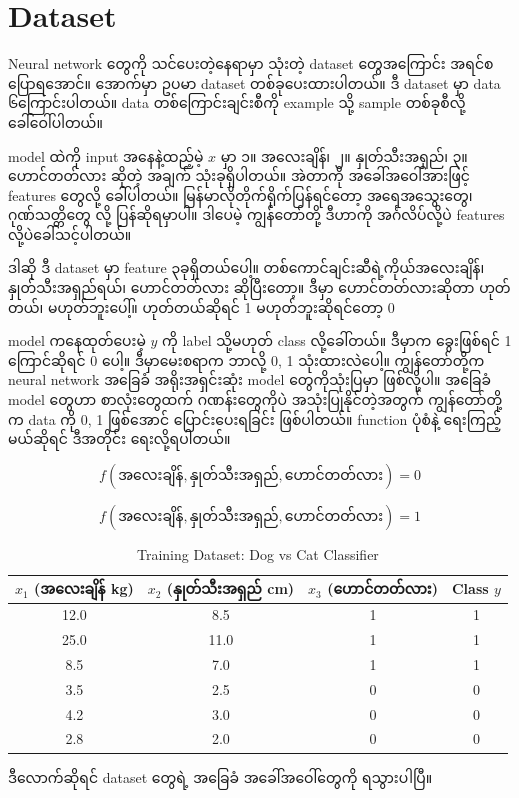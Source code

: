 \section{Dataset}
Neural network တွေကို သင်ပေးတဲ့နေရာမှာ သုံးတဲ့ dataset တွေအကြောင်း အရင်စပြောရအောင်။
အောက်မှာ ဥပမာ dataset တစ်ခုပေးထားပါတယ်။ ဒီ dataset မှာ data ၆ကြောင်းပါတယ်။
data တစ်ကြောင်းချင်းစီကို example သို့ sample တစ်ခုစီလို့ ခေါ်ဝေါ်ပါတယ်။

model ထဲကို input အနေနဲ့ထည့်မဲ့ $x$ မှာ ၁။ အလေးချိန်၊ ၂။ နှုတ်သီးအရှည်၊ ၃။ ဟောင်တတ်လား ဆိုတဲ့
အချက် သုံးခုရှိပါတယ်။ အဲတာကို အခေါ်အဝေါ်အားဖြင့် features တွေလို့ ခေါ်ပါတယ်။ မြန်မာလိုတိုက်ရိုက်ပြန်ရင်တော့ အရေအသွေးတွေ၊
ဂုဏ်သတ္တိတွေ လို့ ပြန်ဆိုရမှာပါ။ ဒါပေမဲ့ ကျွန်တော်တို့ ဒီဟာကို အင်္ဂလိပ်လို့ပဲ features လို့ပဲခေါ်သင့်ပါတယ်။

ဒါဆို ဒီ dataset မှာ feature ၃ခုရှိတယ်ပေါ့။ တစ်ကောင်ချင်းဆီရဲ့ကိုယ်အလေးချိန်၊ နှုတ်သီးအရှည်ရယ်၊ ဟောင်တတ်လား ဆိုပြီးတော့။
ဒီမှာ ဟောင်တတ်လားဆိုတာ ဟုတ်တယ်၊ မဟုတ်ဘူးပေါ့်။ ဟုတ်တယ်ဆိုရင် 1 မဟုတ်ဘူးဆိုရင်တော့ 0

model ကနေထုတ်ပေးမဲ့ $y$ ကို label သို့မဟုတ် class လို့ခေါ်တယ်။ ဒီမှာက ခွေးဖြစ်ရင် 1 ကြောင်ဆိုရင် 0 ပေါ့။ ဒီမှာမေးစရာက ဘာလို့ 0, 1
သုံးထားလဲပေါ့။ ကျွန်တော်တို့က neural network အခြေခံ အရိုးအရှင်းဆုံး model တွေကိုသုံးပြမှာ ဖြစ်လို့ပါ။ အခြေခံ model တွေဟာ စာလုံးတွေထက်
ဂဏန်းတွေကိုပဲ အသုံးပြုနိုင်တဲ့အတွက် ကျွန်တော်တို့က data ကို 0, 1 ဖြစ်အောင် ပြောင်းပေးရခြင်း ဖြစ်ပါတယ်။
function ပုံစံနဲ့ ရေးကြည့်မယ်ဆိုရင် ဒီအတိုင်း ရေးလို့ရပါတယ်။

$$
f(\text{အလေးချိန်}, \text{နှုတ်သီးအရှည်}, \text{ဟောင်တတ်လား}) = 0
$$

$$
f(\text{အလေးချိန်}, \text{နှုတ်သီးအရှည်}, \text{ဟောင်တတ်လား}) = 1
$$

\begin{table}[h]
\centering
\begin{tabular}{cccc}
\hline
$x_1$ (အလေးချိန် kg) & $x_2$ (နှုတ်သီးအရှည် cm) & $x_3$ (ဟောင်တတ်လား) & Class $y$ \\
\hline
12.0 & 8.5  & 1 & 1 \\
25.0 & 11.0 & 1 & 1 \\
8.5  & 7.0  & 1 & 1 \\
3.5  & 2.5  & 0 & 0 \\
4.2  & 3.0  & 0 & 0 \\
2.8  & 2.0  & 0 & 0 \\
\hline
\end{tabular}
\caption{Training Dataset: Dog vs Cat Classifier}
\label{tab:dataset}
\end{table}

\noindent ဒီလောက်ဆိုရင် dataset တွေရဲ့ အခြေခံ အခေါ်အဝေါ်တွေကို ရသွားပါပြီ။